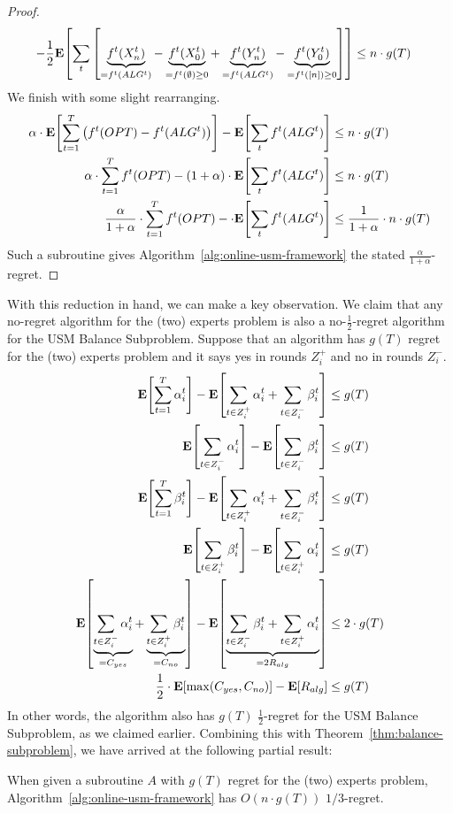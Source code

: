 \documentclass[final,12pt]{colt2018}
\newcommand{\BalanceSubproblem}{USM Balance Subproblem}
\newcommand{\Yes}[1][i]{Z^+_{#1}}
\newcommand{\No}[1][i]{Z^-_{#1}}
\newcommand{\RewardAlg}{R_{alg}}
\newcommand{\CostYes}{C_{yes}}
\newcommand{\CostNo}{C_{no}}
\newcommand{\expect}[2][]{\mathbf{E}\ifthenelse{\not\equal{}{#1}}{_{#1}}{}\!\left[#2\right]}
\begin{document}
\begin{proof}
\begin{align*}
      - \frac12 \expect{
        \sum_t \left[ \underbrace{f^t(X^t_n)}_{=f^t(ALG^t)}
          - \underbrace{f^t(X^t_0)}_{=f^t(\emptyset)\ge 0}
          + \underbrace{f^t(Y^t_n)}_{=f^t(ALG^t)}
          - \underbrace{f^t(Y^t_0)}_{=f^t([n]) \ge 0} \right] }
      &\le n \cdot g(T)
  \end{align*}
  We finish with some slight rearranging.
  \begin{align*}
    \alpha \cdot \expect{ \sum_{t=1}^T \left( f^t(OPT) - f^t(ALG^t) \right) } - \expect{ \sum_t f^t(ALG^t) } &\le n \cdot g(T) \\
    \alpha \cdot \sum_{t=1}^T f^t(OPT) - (1 + \alpha) \cdot \expect{ \sum_t f^t(ALG^t) } &\le n \cdot g(T) \\
    \frac{\alpha}{1+\alpha} \cdot \sum_{t=1}^T f^t(OPT) - \cdot \expect{ \sum_t f^t(ALG^t) } &\le \frac{1}{1+\alpha} \cdot n \cdot g(T)
  \end{align*}
  Such a subroutine gives Algorithm~\ref{alg:online-usm-framework} the stated $\frac{\alpha}{1+\alpha}$-regret.
\end{proof}

With this reduction in hand, we can make a key observation. We claim that any no-regret algorithm for the (two) experts problem is also a no-$\frac12$-regret algorithm for the \BalanceSubproblem{}. Suppose that an algorithm has $g(T)$ regret for the (two) experts problem and it says yes in rounds $\Yes$ and no in rounds $\No$.
\begin{align*}
  \expect{ \sum_{t=1}^T \alpha^t_i } - \expect{ \sum_{t \in \Yes} \alpha^t_i + \sum_{t \in \No} \beta^t_i } &\le g(T) \\
  \expect{ \sum_{t \in \No} \alpha^t_i } - \expect{ \sum_{t \in \No} \beta^t_i } &\le g(T) \\
  \expect{ \sum_{t=1}^T \beta^t_i } - \expect{ \sum_{t \in \Yes} \alpha^t_i + \sum_{t \in \No} \beta^t_i } &\le g(T) \\
  \expect{ \sum_{t \in \Yes} \beta^t_i } - \expect{ \sum_{t \in \Yes} \alpha^t_i } &\le g(T) \\
  \expect{ \underbrace{\sum_{t \in \No} \alpha^t_i}_{=\CostYes}
              + \underbrace{\sum_{t \in \Yes} \beta^t_i}_{=\CostNo} }
    - \expect{ \underbrace{\sum_{t \in \No} \beta^t_i + \sum_{t \in \Yes} \alpha^t_i}_{=2\RewardAlg} } &\le 2 \cdot g(T) \\
  \frac12 \cdot \expect{ \max (\CostYes, \CostNo) } - \expect{ \RewardAlg } &\le g(T)
\end{align*}
In other words, the algorithm also has $g(T)$ $\frac12$-regret for the \BalanceSubproblem{}, as we claimed earlier. Combining this with Theorem~\ref{thm:balance-subproblem}, we have arrived at the following partial result:
\begin{corollary}\label{cor:one-third}
  When given a subroutine $A$ with $g(T)$ regret for the (two) experts problem, Algorithm~\ref{alg:online-usm-framework} has $O(n \cdot g(T))$ $1/3$-regret.
\end{corollary}
\end{document}
